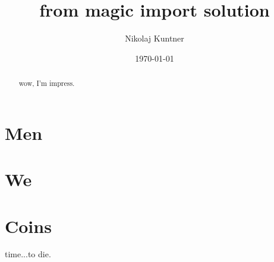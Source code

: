 

\usepackage{graphicx}
\usepackage{listings}
\usepackage{color}
\usepackage{enumitem}
\usepackage{amsmath}
\usepackage{bm}
\usepackage{hyperref}



\title{from magic import solution} %
\author{Nikolaj Kuntner}
\date{\today} %


\maketitle %

\begin{abstract}
wow, I'm impress.
\end{abstract}

\tableofcontents \newpage

\part{Men} 


\newpage
\part{We} 

\newpage
\part{Coins} 

time...to die.

